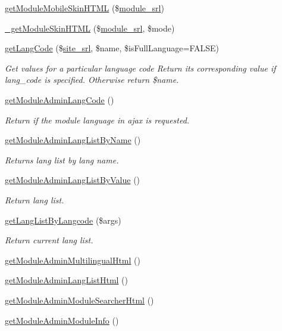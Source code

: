 \begin{DoxyCompactItemize}
\hyperlink{classmoduleAdminModel_a38c85d9c28facff15f1c54ebe1e5b70b}{get\+Module\+Mobile\+Skin\+H\+T\+ML} (\$\hyperlink{ko_8install_8php_a370bb6450fab1da3e0ed9f484a38b761}{module\+\_\+srl})
\item 
\hyperlink{classmoduleAdminModel_ac69c4e024dcabbcaa3f7a13a4c61af04}{\+\_\+get\+Module\+Skin\+H\+T\+ML} (\$\hyperlink{ko_8install_8php_a370bb6450fab1da3e0ed9f484a38b761}{module\+\_\+srl}, \$mode)
\item 
\hyperlink{classmoduleAdminModel_aa10dc8b8645165816c43f140c57b546b}{get\+Lang\+Code} (\$\hyperlink{ko_8install_8php_a8b1406b4ad1048041558dce6bfe89004}{site\+\_\+srl}, \$name, \$is\+Full\+Language=F\+A\+L\+SE)
\begin{DoxyCompactList}\small\item\em Get values for a particular language code Return its corresponding value if lang\+\_\+code is specified. Otherwise return \$name. \end{DoxyCompactList}\item 
\hyperlink{classmoduleAdminModel_a783b7e9e5a0db68d0eb782fff6f7e461}{get\+Module\+Admin\+Lang\+Code} ()
\begin{DoxyCompactList}\small\item\em Return if the module language in ajax is requested. \end{DoxyCompactList}\item 
\hyperlink{classmoduleAdminModel_ab5982d758fb39c6d56c41af9827845cf}{get\+Module\+Admin\+Lang\+List\+By\+Name} ()
\begin{DoxyCompactList}\small\item\em Returns lang list by lang name. \end{DoxyCompactList}\item 
\hyperlink{classmoduleAdminModel_acd8e42367271f853d4da4388fe15b0d1}{get\+Module\+Admin\+Lang\+List\+By\+Value} ()
\begin{DoxyCompactList}\small\item\em Return lang list. \end{DoxyCompactList}\item 
\hyperlink{classmoduleAdminModel_a425b28af6d0f27c2306191d7a4abdbaa}{get\+Lang\+List\+By\+Langcode} (\$args)
\begin{DoxyCompactList}\small\item\em Return current lang list. \end{DoxyCompactList}\item 
\hyperlink{classmoduleAdminModel_a51568f16c761da74a811fe599970ea0f}{get\+Module\+Admin\+Multilingual\+Html} ()
\item 
\hyperlink{classmoduleAdminModel_a1f3f518448a54604d56032927b4ef957}{get\+Module\+Admin\+Lang\+List\+Html} ()
\item 
\hyperlink{classmoduleAdminModel_aca064d49155437d5cad912d1f885933f}{get\+Module\+Admin\+Module\+Searcher\+Html} ()
\item 
\hyperlink{classmoduleAdminModel_a205c97c3919ee573047431c8c2a0e1a7}{get\+Module\+Admin\+Module\+Info} ()
\end{DoxyCompactItemize}
